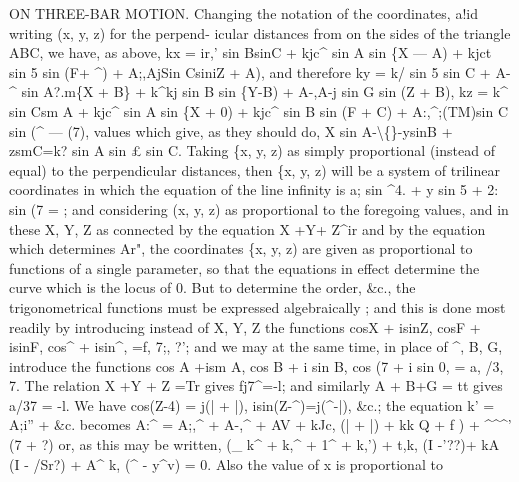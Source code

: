 \documentclass[11pt,a4paper]{book}
\begin{document}
ON THREE-BAR MOTION.
Changing
the
notation
of
the
coordinates,
a!id
writing
(x,
y,
z)
for
the
perpend-
icular distances from
on
the
sides of the
triangle ABC, we have,
as above,
kx = ir,' sin BsinC + kjc\textasciicircum{} sin A sin \{X --- A) + kjct sin 5 sin (F+ \textasciicircum{}) + A;,AjSin CsiniZ + A),
and therefore
ky = k/ sin 5 sin C + A-\textasciicircum{} sin A?.m\{X + B\} + k\textasciicircum{}kj sin B sin \{Y-B) + A-,A-j sin G sin (Z + B),
kz = k\textasciicircum{} sin Csm A + kjc\textasciicircum{} sin A sin \{X + 0) + kjc\textasciicircum{} sin B sin (F + C) + A:,\textasciicircum{};(TM)sin C sin (\textasciicircum{} --- (7),
values which
give,
as they should
do,
X sin A-\textbackslash\{\}-ysinB + zsmC=k? sin A sin \pounds{} sin C.
Taking
\{x,
y,
z)
as
simply
proportional
(instead
of
equal)
to
the
perpendicular
distances, then
\{x,
y,
z)
will
be
a
system
of
trilinear coordinates
in which the equation
of the
line
infinity
is
a; sin \textasciicircum{}4. + y sin 5 +
2: sin (7 =
;
and
considering
(x,
y,
z) as
proportional
to
the foregoing
values, and
in
these X,
Y, Z
as
connected by the
equation X +Y+ Z\textasciicircum{}ir and by the
equation which
determines
Ar",
the
coordinates
\{x,
y, z) are
given
as
proportional
to
functions
of a
single
parameter,
so that the equations
in
effect determine the curve which
is the
locus of 0.
But
to
determine
the
order,
\&c.,
the
trigonometrical
functions
must
be
expressed
algebraically
;
and
this
is
done
most
readily
by
introducing
instead
of X,
Y, Z
the
functions
cosX + isinZ,
cosF + isinF,
cos\textasciicircum{} + isin\textasciicircum{},
=f,
7;,
?';
and we may at the same
time,
in
place of \textasciicircum{}, B,
G, introduce the functions
cos A +ism A,
cos B + i sin B,
cos (7 + i sin 0, = a,
/3,
7.
The
relation X +Y + Z =Tr
gives
fj7\textasciicircum{}=-l;
and
similarly A + B+G = tt
gives
a/37 = -l.
We have
cos(Z-4) = j(| + |),
isin(Z-\textasciicircum{})=j(\textasciicircum{}-|), \&c.;
the equation
k' = A;i'' + \&c. becomes
A:\textasciicircum{} = A;,\textasciicircum{} + A-,\textasciicircum{} + AV + kJc, (| + |) + kk Q + f
) + \textasciicircum{}\textasciicircum{}\textasciicircum{}' (7 + ?)
or, as this may be
written,
(\_ k\textasciicircum{} + k,\textasciicircum{} + 1\textasciicircum{} + k,') + t,k, (I -\guillemotleft{}'??)+ kA
(I - /Sr?) + A\textasciicircum{} k, (\textasciicircum{} - y\textasciicircum{}v) = 0.
Also the value of x
is proportional
to
\end{document}
